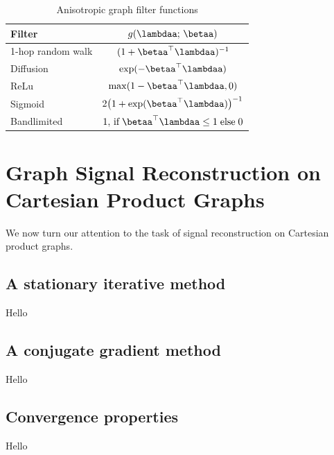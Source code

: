 \begin{table}[t]
    \def\arraystretch{1.7}
    \small
    \begin{center}
    \begin{tabular}{|l|c|}
    \hline
    \textbf{Filter}   & $g(\lambdaa; \,\betaa)$    \\ 
    \hline
    1-hop random walk & $(1 + \betaa^\top\lambdaa)^{-1}$ \\
    \hline
    Diffusion         & $\exp(-\betaa^\top\lambdaa)$       \\
    \hline
    ReLu              & $\max (1 - \betaa^\top\lambdaa, 0)$  \\
    \hline
    Sigmoid           & $2 \big( 1 + \exp(\betaa^\top\lambdaa)\big)^{-1}$ \\
    \hline
    Bandlimited       & $1, \,\text{if} \; \betaa^\top\lambdaa \leq 1 \; \text{else} \; 0$   \\
    \hline
    \end{tabular}
    \end{center}
    \caption{Anisotropic graph filter functions}
    \label{tab:anis_filters}
    \end{table}



\section{Graph Signal Reconstruction on Cartesian Product Graphs}

\label{sec:gsr_cpg}

We now turn our attention to the task of signal reconstruction on Cartesian product graphs. 

\subsection{A stationary iterative method}

Hello

\subsection{A conjugate gradient method}

Hello

\subsection{Convergence properties}

Hello

